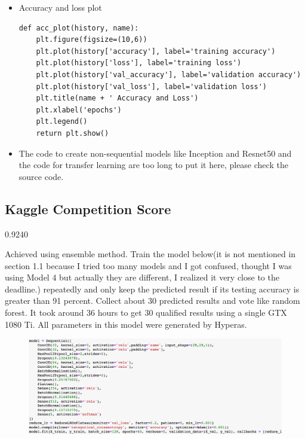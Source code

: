 \documentclass[12pt]{article}
\begin{document}
\begin{singlespacing}
\begin{itemize}
\item Accuracy and loss plot
\begin{verbatim}
def acc_plot(history, name):
    plt.figure(figsize=(10,6))
    plt.plot(history['accuracy'], label='training accuracy')
    plt.plot(history['loss'], label='training loss')    
    plt.plot(history['val_accuracy'], label='validation accuracy')
    plt.plot(history['val_loss'], label='validation loss')
    plt.title(name + ' Accuracy and Loss')
    plt.xlabel('epochs')
    plt.legend()
    return plt.show()
\end{verbatim}

\item The code to create non-sequential models like Inception and Resnet50 and the code for transfer learning are too long to put it here, please check the source code.
\end{itemize}
\end{singlespacing}

\subsection{Kaggle Competition Score}

0.9240

Achieved using ensemble method. Train the model below(it is not mentioned in section 1.1 because I tried too many models and I got confused, thought I was using Model 4 but actually they are different, I realized it very close to the deadline.) repeatedly and only keep the predicted result if its testing accuracy is greater than 91 percent. Collect about 30 predicted results and vote like random forest. It took around 36 hours to get 30 qualified results using a single GTX 1080 Ti. All parameters in this model were generated by Hyperas.

\begin{figure}[H]
\begin{center}
    \includegraphics[width=1.0\textwidth]{../plots/final_model.png}
\end{center}
\end{figure}
\end{document}
